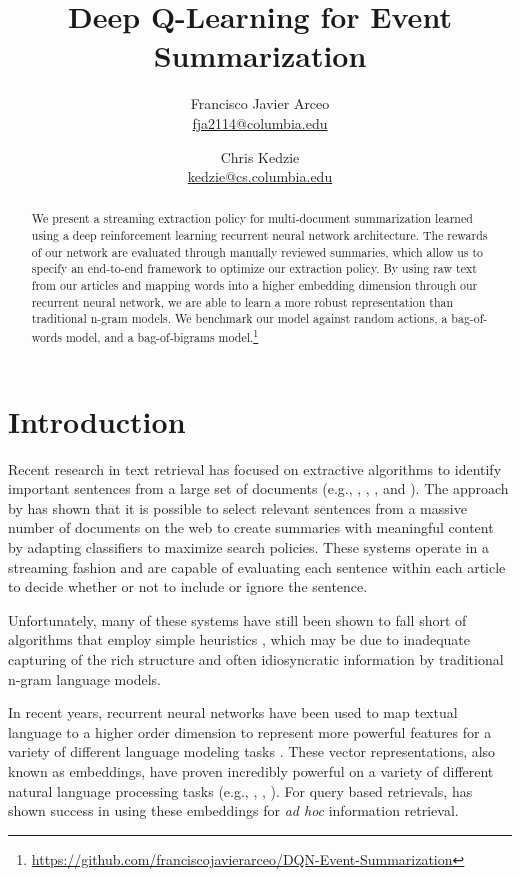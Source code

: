 \documentclass[12pt]{article}
\title{Deep Q-Learning for Event Summarization}
\author{
	Francisco Javier Arceo \\ \href{mailto: fja2114@columbia.edu}{\small fja2114@columbia.edu} 
		\and  
	Chris Kedzie \\ \href{mailto: kedzie@cs.columbia.edu}{\small kedzie@cs.columbia.edu} 
	}
\begin{document}
\maketitle

\begin{abstract}
We present a streaming extraction policy for multi-document summarization learned using a deep reinforcement learning recurrent neural network architecture. The rewards of our network are evaluated through manually reviewed summaries, which allow us to specify an end-to-end framework to optimize our extraction policy.  By using raw text from our articles and mapping words into a higher embedding dimension through our recurrent neural network, we are able to learn a more robust representation than traditional n-gram models. We benchmark our model against random actions, a bag-of-words model, and a bag-of-bigrams model.\footnote{ \url{https://github.com/franciscojavierarceo/DQN-Event-Summarization} }
\end{abstract}



\section{Introduction}

Recent research in text retrieval  has focused on extractive algorithms to identify important sentences from a large set of documents (e.g., \cite{diazquery}, \cite{kedzie2015predicting}, \cite{garbacea2015university}, and \cite{kedzieextractive}). The approach by \cite{kedzie2015predicting}  has shown that it is possible to select relevant sentences from a massive number of documents on the web to create summaries with meaningful content by adapting classifiers to maximize search policies. These systems operate in a streaming fashion and are capable of evaluating each sentence within each article to decide whether or not to include or ignore the sentence. 

Unfortunately, many of these systems have still been shown to fall short of algorithms that employ simple heuristics \cite{garbacea2015university}, which may be due to inadequate capturing of the rich structure and often idiosyncratic information by traditional n-gram language models.  

In recent years, recurrent neural networks have been used to map textual language to a higher order dimension to represent more powerful features for a variety of different language modeling tasks \cite{mikolov2010recurrent}. These vector representations, also known as embeddings, have proven incredibly powerful on a variety of different natural language processing tasks (e.g., \cite{bengio2003neural}, \cite{sundermeyer2012lstm}, \cite{kim2016character}). For query based retrievals, \cite{diazquery} has shown success in using these embeddings for \emph{ad hoc} information retrieval.
\end{document}
